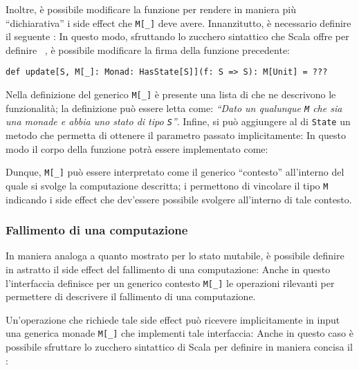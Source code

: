 Inoltre, è possibile modificare la funzione per rendere in maniera più ``dichiarativa'' i side effect che \lstinline{M[_]} deve avere. Innanzitutto, è necessario definire il seguente :
In questo modo, sfruttando lo zucchero sintattico che Scala offre per definire ~\cite{cit:context-bounds}, è possibile modificare la firma della funzione precedente:
\begin{lstlisting}[language=scala3]
def update[S, M[_]: Monad: HasState[S]](f: S => S): M[Unit] = ???
\end{lstlisting}
Nella definizione del generico \lstinline{M[_]} è presente una lista di  che ne descrivono le funzionalità; la definizione può essere letta come: \emph{``Dato un qualunque \lstinline{M} che sia una monade e abbia uno stato di tipo \lstinline{S}''}.
Infine, si può aggiungere al  di \lstinline{State} un metodo che permetta di ottenere il parametro passato implicitamente:
In questo modo il corpo della funzione potrà essere implementato come:

Dunque, \lstinline{M[_]} può essere interpretato come il generico ``contesto'' all'interno del quale si svolge la computazione descritta; i  permettono di vincolare il tipo \lstinline{M} indicando i side effect che dev'essere possibile svolgere all'interno di tale contesto.

\subsubsection{Fallimento di una computazione}
In maniera analoga a quanto mostrato per lo stato mutabile, è possibile definire in astratto il side effect del fallimento di una computazione:
Anche in questo l'interfaccia definisce per un generico contesto \lstinline{M[_]} le operazioni rilevanti per permettere di descrivere il fallimento di una computazione.

Un'operazione che richiede tale side effect può ricevere implicitamente in input una generica monade \lstinline{M[_]} che implementi tale interfaccia:
Anche in questo caso è possibile sfruttare lo zucchero sintattico di Scala per definire in maniera concisa il :

